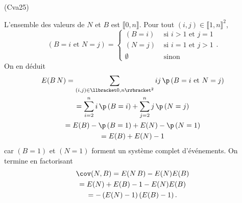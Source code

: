 \begin{tiny}(Cva25)\end{tiny} L'ensemble des valeurs de $N$ et $B$ est $\llbracket 0,n \rrbracket$. Pour tout $(i,j) \in \llbracket 1,n \rrbracket^2$,
\[
 \left( B = i \text{ et } N = j\right) =
\left\lbrace 
\begin{aligned}
 \left( B = i\right) &\text{ si } i>1 \text{ et } j = 1\\
 \left( N = j\right) &\text{ si } i=1 \text{ et } j > 1\\
 \emptyset &\text{ sinon}
\end{aligned}
\right. .
\]
On en déduit
\begin{multline*}
 E(B\,N)
 = \sum_{(i,j)\in \llbracket 0,n \rrbracket^2}ij\,\p\left( B = i \text{ et } N = j\right)\\
 = \sum_{i=2}^{n}i\,\p\left( B = i\right) + \sum_{j=2}^{n}j\,\p\left( N = j\right) \\
 = E(B) - \p\left( B = 1\right) + E(N) - \p\left( N = 1\right) \\
 = E(B) + E(N) - 1
\end{multline*}
car $\left( B = 1\right)$ et $\left( N = 1\right)$ forment un système complet d'événements.
On termine en factorisant
\begin{multline*}
 \cov(N,B) = E(N\,B) - E(N)E(B)\\
 = E(N) + E(B) -1 - E(N)E(B)\\
 = -\left( E(N) - 1\right)\left( E(B) - 1\right). 
\end{multline*}
